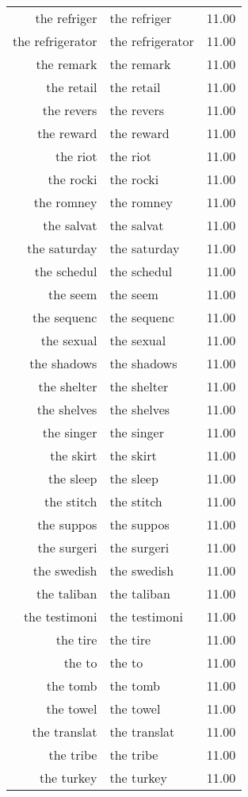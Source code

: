 \begin{table}[ht]
\begin{tabular}{rlr}
  the refriger & the refriger & 11.00 \\ 
  the refrigerator & the refrigerator & 11.00 \\ 
  the remark & the remark & 11.00 \\ 
  the retail & the retail & 11.00 \\ 
  the revers & the revers & 11.00 \\ 
  the reward & the reward & 11.00 \\ 
  the riot & the riot & 11.00 \\ 
  the rocki & the rocki & 11.00 \\ 
  the romney & the romney & 11.00 \\ 
  the salvat & the salvat & 11.00 \\ 
  the saturday & the saturday & 11.00 \\ 
  the schedul & the schedul & 11.00 \\ 
  the seem & the seem & 11.00 \\ 
  the sequenc & the sequenc & 11.00 \\ 
  the sexual & the sexual & 11.00 \\ 
  the shadows & the shadows & 11.00 \\ 
  the shelter & the shelter & 11.00 \\ 
  the shelves & the shelves & 11.00 \\ 
  the singer & the singer & 11.00 \\ 
  the skirt & the skirt & 11.00 \\ 
  the sleep & the sleep & 11.00 \\ 
  the stitch & the stitch & 11.00 \\ 
  the suppos & the suppos & 11.00 \\ 
  the surgeri & the surgeri & 11.00 \\ 
  the swedish & the swedish & 11.00 \\ 
  the taliban & the taliban & 11.00 \\ 
  the testimoni & the testimoni & 11.00 \\ 
  the tire & the tire & 11.00 \\ 
  the to & the to & 11.00 \\ 
  the tomb & the tomb & 11.00 \\ 
  the towel & the towel & 11.00 \\ 
  the translat & the translat & 11.00 \\ 
  the tribe & the tribe & 11.00 \\ 
  the turkey & the turkey & 11.00 \\ 

\end{tabular}
\end{table}
